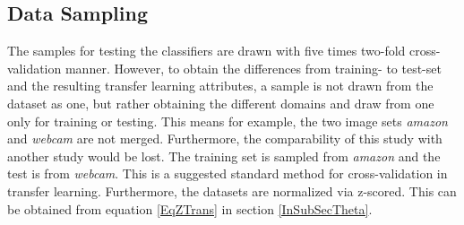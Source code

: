 \subsection{Data Sampling}\label{EmSubSecDataS}
The samples for testing the classifiers are drawn with five times two-fold cross-validation manner.
However, to obtain the differences from training- to test-set and the resulting transfer learning attributes, a sample is not drawn from the dataset as one, but rather obtaining the different domains and draw from one only for training or testing.
This means for example, the two image sets \textit{amazon} and \textit{webcam} are not merged.
Furthermore, the comparability of this study with another study would be lost.
The training set is sampled from \textit{amazon} and the test is from \textit{webcam}.
This is a suggested standard method for cross-validation in transfer learning.\cite{Gong.}
Furthermore, the datasets are normalized via z-scored.
This can be obtained from equation \ref{EqZTrans} in section \ref{InSubSecTheta}.
